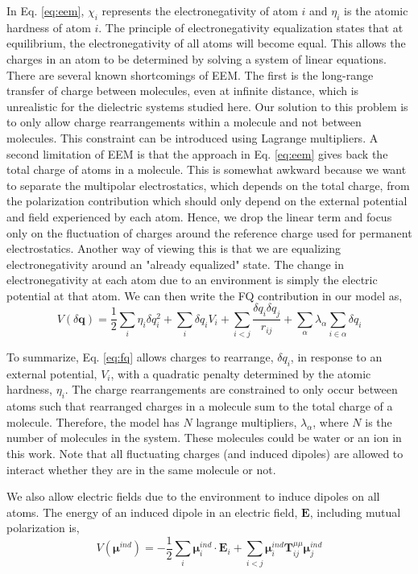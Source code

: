 \documentclass[journal=jacsat,manuscript=article]{achemso}
\begin{document}
In Eq. \ref{eq:eem}, $\chi_i$ represents the electronegativity of atom $i$ and
$\eta_i$ is the atomic hardness of atom $i$. The principle of electronegativity
equalization states that  at equilibrium, the electronegativity of all atoms
will become equal. This allows the charges in an atom to be determined by solving
a system of linear equations. There are several known shortcomings of EEM. The first
is the long-range transfer of charge between molecules, even at infinite distance,
which is unrealistic for the dielectric systems studied here.\cite{chen2007qtpie,chen2008unified}
Our solution to this problem is to only allow charge rearrangements within
a molecule and not between molecules. This constraint can be introduced using
Lagrange multipliers. A second limitation of EEM is that the approach in Eq. \ref{eq:eem}
gives back the total charge of atoms in a molecule. This is somewhat awkward because
we want to separate the multipolar electrostatics, which depends on the total charge,
from the polarization contribution which should only depend on the external potential
and field experienced by each atom. Hence, we drop the linear term and focus only on the
fluctuation of charges around the reference charge used for permanent electrostatics.
Another way of viewing this is that we are equalizing electronegativity around an "already
equalized" state. The change in electronegativity at each atom due to an environment is simply
the electric potential at that atom. We can then write the FQ contribution in our
model as,
\begin{equation}
  V(\delta \bm{q})=\frac12\sum_i \eta_i \delta q_i^2 + \sum_i \delta q_i V_i + \sum_{i<j}\frac{\delta q_i \delta q_j}{r_{ij}} + \sum_{\alpha}\lambda_\alpha \sum_{i\in\alpha}\delta q_{i}
  \label{eq:fq}
\end{equation}

To summarize, Eq. \ref{eq:fq} allows charges to rearrange, $\delta q_i$, in response to an external
potential, $V_i$, with a quadratic penalty determined by the atomic hardness, $\eta_i$.
The charge rearrangements are constrained to only occur between atoms such that rearranged
charges in a molecule sum to the total charge of a molecule. Therefore, the model has $N$ lagrange
multipliers, $\lambda_\alpha$, where $N$ is the number of molecules in the system. These molecules
could be water or an ion in this work. Note that all fluctuating charges (and induced
dipoles) are allowed to interact whether they are in the same molecule or not.

We also allow electric fields due to the environment to induce dipoles on all atoms.
The energy of an induced dipole in an electric field, $\bm{E}$, including mutual polarization is,
\begin{equation}
  V(\bm{\mu}^{ind})=-\frac12\sum_i \bm{\mu}_i^{ind}\cdot \bm{E}_i + \sum_{i<j}\bm{\mu}^{ind}_i \bm{T}^{\mu\mu}_{ij}\bm{\mu}^{ind}_j
  \label{eq:induced_dipoles}
\end{equation}
\end{document}

